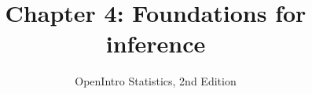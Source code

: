 \documentclass[slidestop,compress,mathserif]{beamer}
\title[Chp 4: Foundations for inference]{Chapter 4: Foundations for inference}
\author{OpenIntro Statistics, 2nd Edition}
\date{}
\institute{}
\begin{document}


\begin{frame}[plain]

\titlepage

\end{frame}










\end{document}
